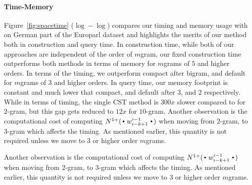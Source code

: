 \paragraph{Time-Memory}
Figure~\ref{fig:spacetime} ($\log-\log$) compares our timing and memory usage with \SRILM on German part of the Europarl dataset and highlights the merits of our method both in construction and query time. In construction time, while both of our approaches are independent of the order of $m$gram, our fixed construction time outperforms both \SRILM methods in terms of memory for $m$grams of $5$ and higher orders. In terms of the timing, we outperform \SRILM compact after bigram, and \SRILM default for $m$grams of $3$ and higher orders. In query time, our memory footprint is constant and much lower that \SRILM compact, and default after $3$, and $2$ respectively. While in terms of timing, the single CST method is $300x$ slower compared to \SRILM for $2$-gram, but this gap gets reduced to $12x$ for $10$-gram.  Another observation is the computational cost of computing $\nlplus{\Bigcdot w_{i-k+1}^{i-1} \Bigcdot}$ when moving from $2$-gram, to $3$-gram which affects the timing. As mentioned earlier, this quantity is not required unless we move to $3$ or higher order $m$grams.

Another observation is the computational cost of computing $\nlplus{\Bigcdot w_{i-k+1}^{i-1} \Bigcdot}$ when moving from $2$-gram, to $3$-gram which affects the timing. As mentioned earlier, this quantity is not required unless we move to $3$ or higher order $m$grams.

